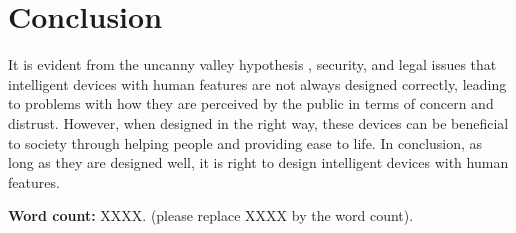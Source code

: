 \documentclass{article}
\begin{document}
\section{Conclusion}
It is evident from the uncanny valley hypothesis \cite{mori1970valley}, security, and legal issues that intelligent devices with human features are not always designed correctly, leading to problems with how they are perceived by the public in terms of concern and distrust. However, when designed in the right way, these devices can be beneficial to society through helping people and providing ease to life. In conclusion, as long as they are designed well, it is right to design intelligent devices with human features.

\vspace{.5cm}
\noindent \textbf{Word count:} XXXX. (please replace XXXX by the word count).



\end{document}

